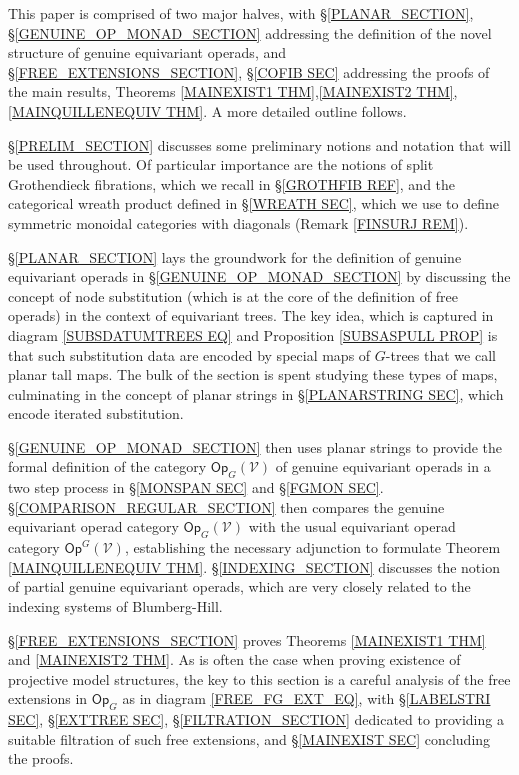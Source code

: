 \documentclass[a4paper,10pt
,draft
]{article}%
\numberwithin{equation}{section}
\numberwithin{figure}{section}
\theoremstyle{definition} %
\newcommand{\1}{\ensuremath{\mathbbm 1}}%
\begin{document}

This paper is comprised of two major halves, 
with 
\S \ref{PLANAR_SECTION},
\S \ref{GENUINE_OP_MONAD_SECTION}
addressing the definition of the novel structure of
genuine equivariant operads,
and 
\S \ref{FREE_EXTENSIONS_SECTION},
\S \ref{COFIB SEC}
addressing the proofs of the main results,
Theorems \ref{MAINEXIST1 THM},\ref{MAINEXIST2 THM},\ref{MAINQUILLENEQUIV THM}.
A more detailed outline follows.

\S \ref{PRELIM_SECTION}
discusses some preliminary notions and notation that will be used throughout.
Of particular importance are the notions of 
split Grothendieck fibrations,
which we recall in \S \ref{GROTHFIB REF},
and the categorical wreath product defined in 
\S \ref{WREATH SEC}, which we use to define
symmetric monoidal categories with diagonals
(Remark \ref{FINSURJ REM}).

\S \ref{PLANAR_SECTION} lays the groundwork for the definition of genuine equivariant operads in 
\S \ref{GENUINE_OP_MONAD_SECTION} by discussing the concept of node substitution (which is at the core of the definition of free operads)
in the context of equivariant trees. The key idea, which is captured in diagram
\eqref{SUBSDATUMTREES EQ} and Proposition \ref{SUBSASPULL PROP}
is that such substitution data are encoded by special maps of $G$-trees that we call planar tall maps. The bulk of the section is spent studying these types of maps, culminating in the concept of planar strings in \S \ref{PLANARSTRING SEC}, which encode iterated substitution.

\S \ref{GENUINE_OP_MONAD_SECTION} then uses planar strings to provide the formal definition of the category 
$\mathsf{Op}_G(\mathcal{V})$
of genuine equivariant operads in a 
two step process in 
\S \ref{MONSPAN SEC} and \S \ref{FGMON SEC}.
\S \ref{COMPARISON_REGULAR_SECTION} then compares 
the genuine equivariant operad category
$\mathsf{Op}_G(\mathcal{V})$
with the usual equivariant operad category
$\mathsf{Op}^G(\mathcal{V})$,
establishing the necessary adjunction to formulate
Theorem \ref{MAINQUILLENEQUIV THM}.
\S \ref{INDEXING_SECTION}
discusses the notion of partial genuine equivariant operads, which are very closely related to the indexing systems of Blumberg-Hill.


\S \ref{FREE_EXTENSIONS_SECTION} 
proves 
Theorems \ref{MAINEXIST1 THM} and \ref{MAINEXIST2 THM}.
As is often the case when proving existence of projective model structures,
the key to this section is a careful analysis of  the free extensions in $\mathsf{Op}_G$ as in diagram
\eqref{FREE_FG_EXT_EQ},
with 
\S \ref{LABELSTRI SEC}, 
\S \ref{EXTTREE SEC},
\S \ref{FILTRATION_SECTION}
dedicated to providing a suitable filtration of such free extensions,
and \S \ref{MAINEXIST SEC} concluding the proofs.
\end{document}

